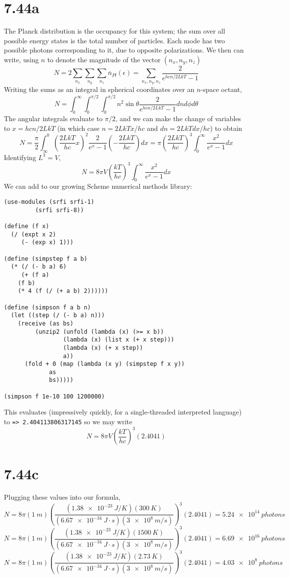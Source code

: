 \documentclass{article}
\begin{document}
\section*{7.44a}
The Planck distribution is the occupancy for this system; the sum over all possible energy states is the total number of particles.
Each mode has two possible photons corresponding to it, due to opposite polarizations.
We then can write, using $n$ to denote the magnitude of the vector $(n_{x},n_{y},n_{z})$
\[
  N=2\sum_{n_{x}}\sum_{n_{y}}\sum_{n_{z}}\overline{n}_{Pl}(\epsilon)
  =\sum_{n_{x},n_{y},n_{z}}\frac{2}{e^{hcn/2LkT}-1}
\]
Writing the sums as an integral in spherical coordinates over an $n$-space octant,
\[
  N=\int_{0}^{\infty}\int_{0}^{\pi/2}\int_{0}^{\pi/2}n^{2}\sin\theta\frac{2}{e^{hcn/2LkT}-1}dnd\phi d\theta
\]
The angular integrals evaluate to $\pi/2$, and we can make the change of variables to $x=hcn/2LkT$
(in which case $n=2LkTx/hc$ and $dn=2LkTdx/hc$) to obtain
\[
  N=\frac{\pi}{2}\int_{\infty}^{0}\left( \frac{2LkT}{hc}x \right)^{2}\frac{2}{e^x-1}\left(  -\frac{2LkT}{hc}\right)dx
  =\pi\left( \frac{2LkT}{hc}\right)^{3}\int_{0}^{\infty}\frac{x^{2}}{e^{x}-1}dx
\]
Identifying $L^{3}=V$,
\[
  N=8\pi V\left( \frac{kT}{hc} \right)^{3}\int_{0}^{\infty}\frac{x^{2}}{e^{x}-1}dx
\]
\newpage
We can add to our growing Scheme numerical methods library:
\begin{verbatim}
(use-modules (srfi srfi-1)
	     (srfi srfi-8))

(define (f x)
  (/ (expt x 2)
     (- (exp x) 1)))

(define (simpstep f a b)
  (* (/ (- b a) 6)
     (+ (f a)
	(f b)
	(* 4 (f (/ (+ a b) 2))))))

(define (simpson f a b n)
  (let ((step (/ (- b a) n)))
    (receive (as bs)
	     (unzip2 (unfold (lambda (x) (>= x b))
			     (lambda (x) (list x (+ x step)))
			     (lambda (x) (+ x step))
			     a))
      (fold + 0 (map (lambda (x y) (simpstep f x y))
		     as
		     bs)))))

(simpson f 1e-10 100 1200000)
\end{verbatim}
This evaluates (impressively quickly, for a single-threaded interpreted language) to \newline
\verb|=> 2.404113806317145| \newline
so we may write
\[
  N=8\pi V\left( \frac{kT}{hc} \right)^{3}(2.4041)
\]

\section*{7.44c}
Plugging these values into our formula,
\[
  N=8\pi(\SI{1}{m})\left( \frac{(\SI{1.38e-23}{J/K})(\SI{300}{K})}{(\SI{6.67e-34}{J\cdot s})(\SI{3e8}{m/s})} \right)^{3}(2.4041)
  =\SI{5.24e14}{photons}
\]
\[
  N=8\pi(\SI{1}{m})\left( \frac{(\SI{1.38e-23}{J/K})(\SI{1500}{K})}{(\SI{6.67e-34}{J\cdot s})(\SI{3e8}{m/s})} \right)^{3}(2.4041)
  =\SI{6.69e16}{photons}
\]
\[
  N=8\pi(\SI{1}{m})\left( \frac{(\SI{1.38e-23}{J/K})(\SI{2.73}{K})}{(\SI{6.67e-34}{J\cdot s})(\SI{3e8}{m/s})} \right)^{3}(2.4041)
  =\SI{4.03e8}{photons}
\]
\end{document}
